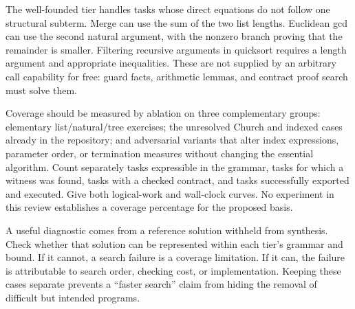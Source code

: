 The well-founded tier handles tasks whose direct equations do not follow one structural subterm. Merge can use the sum of the two list lengths. Euclidean gcd can use the second natural argument, with the nonzero branch proving that the remainder is smaller. Filtering recursive arguments in quicksort requires a length argument and appropriate inequalities. These are not supplied by an arbitrary call capability for free: guard facts, arithmetic lemmas, and contract proof search must solve them.

Coverage should be measured by ablation on three complementary groups: elementary list/natural/tree exercises; the unresolved Church and indexed cases already in the repository; and adversarial variants that alter index expressions, parameter order, or termination measures without changing the essential algorithm. Count separately tasks expressible in the grammar, tasks for which a witness was found, tasks with a checked contract, and tasks successfully exported and executed. Give both logical-work and wall-clock curves. No experiment in this review establishes a coverage percentage for the proposed basis.

A useful diagnostic comes from a reference solution withheld from synthesis. Check whether that solution can be represented within each tier's grammar and bound. If it cannot, a search failure is a coverage limitation. If it can, the failure is attributable to search order, checking cost, or implementation. Keeping these cases separate prevents a ``faster search'' claim from hiding the removal of difficult but intended programs.
